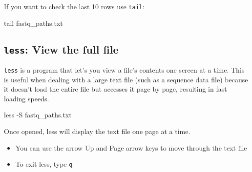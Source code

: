 \documentclass[
  letterpaper,
  DIV=11,
  numbers=noendperiod]{scrreprt}
\newenvironment{Shaded}{}{}
\newcommand{\AttributeTok}[1]{\textcolor[rgb]{0.84,0.23,0.29}{#1}}
\newcommand{\FunctionTok}[1]{\textcolor[rgb]{0.44,0.26,0.76}{#1}}
\newcommand{\NormalTok}[1]{\textcolor[rgb]{0.14,0.16,0.18}{#1}}
\providecommand{\tightlist}{%
  \setlength{\itemsep}{0pt}\setlength{\parskip}{0pt}}\usepackage{longtable,booktabs,array}
\begin{document}
If you want to check the last 10 rows use \texttt{tail}:

\begin{Shaded}
\begin{Highlighting}[]
\FunctionTok{tail}\NormalTok{ fastq\_paths.txt}
\end{Highlighting}
\end{Shaded}

\subsection{\texorpdfstring{\texttt{less}: View the full
file}{less: View the full file}}\label{less-view-the-full-file}

\texttt{less} is a program that let's you view a file's contents one
screen at a time. This is useful when dealing with a large text file
(such as a sequence data file) because it doesn't load the entire file
but accesses it page by page, resulting in fast loading speeds.

\begin{Shaded}
\begin{Highlighting}[]
\FunctionTok{less} \AttributeTok{{-}S}\NormalTok{ fastq\_paths.txt}
\end{Highlighting}
\end{Shaded}

Once opened, less will display the text file one page at a time.

\begin{itemize}
\tightlist
\item
  You can use the arrow Up and Page arrow keys to move through the text
  file
\item
  To exit less, type \texttt{q}
\end{itemize}
\end{document}
